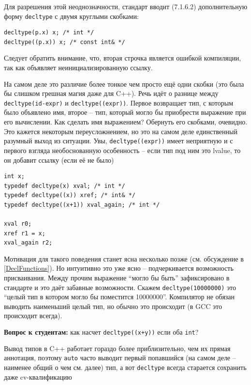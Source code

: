 \documentclass[a4paper,12pt,oneside]{book}
\newif\ifanswers
\begin{document}
Для разрешения этой неоднозначности, стандарт вводит (7.1.6.2) дополнительную форму \lstinline!decltype! с двумя круглыми скобками:

\begin{lstlisting}
decltype(p.x) x; /* int */
decltype((p.x)) x; /* const int& */
\end{lstlisting}

Следует обратить внимание, что, вторая строчка является ошибкой компиляции, так как объявляет неинициализированную ссылку.

На самом деле это различие более тонкое чем просто ещё одни скобки (это была бы слишком грешная магия даже для C++). Речь идёт о разнице между \lstinline!decltype(id-expr)! и \lstinline!decltype((expr))!. Первое возвращает тип, с которым было объявлено имя, второе -- тип, который могло бы приобрести выражение при его вычислении. Как сделать имя выражением? Обернуть его скобками, очевидно. Это кажется некоторым переусложнением, но это на самом деле единственный разумный выход из ситуации. Увы, \lstinline!decltype((expr))! имеет неприятную и с первого взгляда необоснованную особенность -- если тип под ним это lvalue, то он добавит ссылку (если её не было)

\begin{lstlisting}
int x;
typedef decltype(x) xval; /* int */
typedef decltype((x)) xref; /* int& */
typedef decltype((x+1)) xval_again; /* int */

xval r0;
xref r1 = x;
xval_again r2;
\end{lstlisting}

Мотивация для такого поведения станет ясна несколько позже (см. обсуждение в \ref{DeclFunctions}). Но интуитивно это уже ясно -- подчеркивается возможность присваивания. Между прочим выражение ``могло бы быть'' зафиксировано в стандарте и это даёт забавные возможности. Скажем \lstinline!decltype(10000000)! это ``целый тип в котором могло бы поместится 10000000''. Компилятор не обязан выводить наименьший целый тип, но обычно это происходит (в GCC это происходит всегда).

\textbf{Вопрос к студентам:} как насчет \lstinline!decltype((x+y))! если оба \lstinline!int!?

\ifanswers
Правильный ответ: конечно же сумма это не lvalue.
\fi

Вывод типов в C++ работает гораздо более приблизительно, чем их прямая аннотация, поэтому \lstinline!auto! часто выводит первый попавшийся (на самом деле -- наименее общий о чем см. далее) тип, а вот \lstinline!decltype! всегда старается сохранить даже cv-квалификацию
\end{document}
